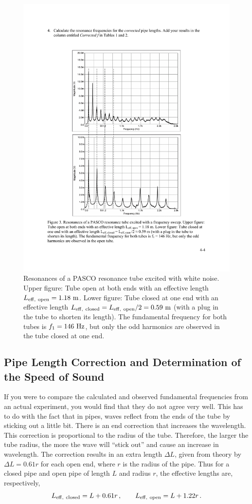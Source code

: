 \documentclass[11pt]{NSF}
\def\be{\begin{equation}}
\def\ee{\end{equation}}
\begin{document}
\begin{figure}[hbtp]
\begin{center}
\includegraphics[width=.7\textwidth]{fig4_3}
\caption{Resonances of a PASCO resonance tube excited with white noise.
Upper figure: Tube open at both ends with an effective length 
$L_{\rm eff,\ open} = 1.18~{\rm m}$.
Lower figure: Tube closed at one end with an effective length 
$L_{\rm eff,\ closed} = L_{\rm eff,\ open}/2 = 0.59~{\rm m}$ 
(with a plug in the tube to shorten its length). 
The fundamental frequency for both tubes is $f_1 = 146~{\rm Hz}$, 
but only the odd harmonics are observed in the tube closed at one end.}
\label{f:3} 
\end{center} 
\end{figure}
%

\subsection{Pipe Length Correction and Determination of the Speed of Sound}

If you were to compare the calculated and observed
fundamental frequencies from an actual experiment,
you would find that they do not agree very well.
This has to do with the fact that in pipes, waves 
reflect from the ends of the tube by sticking out a little bit. 
There is an end correction that increases the wavelength. 
This correction is proportional to the radius of the tube. 
Therefore, the larger the tube radius, the more the wave 
will ``stick out” and cause an increase in wavelength. 
The correction results in an extra length $\Delta L$, 
given from theory by $\Delta L = 0.61 r$ for each open end, 
where $r$ is the radius of the pipe. 
Thus for a closed pipe and open pipe of length $L$ and 
radius $r$, the effective lengths are, respectively,
%
\be
L_{\rm eff,\ closed} = L + 0.61 r\,,
\qquad
L_{\rm eff,\ open} = L + 1.22 r\,.
\label{e:Leff}
\ee
\end{document}
